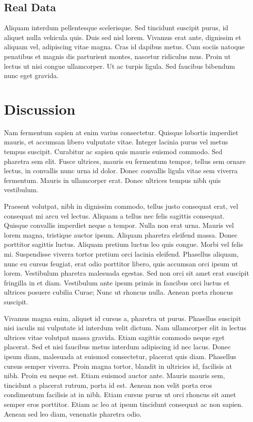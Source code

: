 \documentclass[draft,grl]{AGUTeX}
\begin{document}
\begin{article}
\subsection{Real Data}

Aliquam interdum pellentesque scelerisque. Sed tincidunt suscipit purus, id aliquet nulla vehicula quis. Duis sed nisl lorem. Vivamus erat ante, dignissim et aliquam vel, adipiscing vitae magna. Cras id dapibus metus. Cum sociis natoque penatibus et magnis dis parturient montes, nascetur ridiculus mus. Proin ut lectus ut nisi congue ullamcorper. Ut ac turpis ligula. Sed faucibus bibendum nunc eget gravida.


\section{Discussion}

Nam fermentum sapien at enim varius consectetur. Quisque lobortis imperdiet mauris, et accumsan libero vulputate vitae. Integer lacinia purus vel metus tempus suscipit. Curabitur ac sapien quis mauris euismod commodo. Sed pharetra sem elit. Fusce ultrices, mauris eu fermentum tempor, tellus sem ornare lectus, in convallis nunc urna id dolor. Donec convallis ligula vitae sem viverra fermentum. Mauris in ullamcorper erat. Donec ultrices tempus nibh quis vestibulum.

Praesent volutpat, nibh in dignissim commodo, tellus justo consequat erat, vel consequat mi arcu vel lectus. Aliquam a tellus nec felis sagittis consequat. Quisque convallis imperdiet neque a tempor. Nulla non erat urna. Mauris vel lorem magna, tristique auctor ipsum. Aliquam pharetra eleifend massa. Donec porttitor sagittis luctus. Aliquam pretium luctus leo quis congue. Morbi vel felis mi. Suspendisse viverra tortor pretium orci lacinia eleifend. Phasellus aliquam, nunc eu cursus feugiat, erat odio porttitor libero, quis accumsan orci ipsum ut lorem. Vestibulum pharetra malesuada egestas. Sed non orci sit amet erat suscipit fringilla in et diam. Vestibulum ante ipsum primis in faucibus orci luctus et ultrices posuere cubilia Curae; Nunc ut rhoncus nulla. Aenean porta rhoncus suscipit.

Vivamus magna enim, aliquet id cursus a, pharetra ut purus. Phasellus suscipit nisi iaculis mi vulputate id interdum velit dictum. Nam ullamcorper elit in lectus ultrices vitae volutpat massa gravida. Etiam sagittis commodo neque eget placerat. Sed et nisi faucibus metus interdum adipiscing id nec lacus. Donec ipsum diam, malesuada at euismod consectetur, placerat quis diam. Phasellus cursus semper viverra. Proin magna tortor, blandit in ultricies id, facilisis at nibh. Proin eu neque est. Etiam euismod auctor ante. Mauris mauris sem, tincidunt a placerat rutrum, porta id est. Aenean non velit porta eros condimentum facilisis at in nibh. Etiam cursus purus ut orci rhoncus sit amet semper eros porttitor. Etiam ac leo at ipsum tincidunt consequat ac non sapien. Aenean sed leo diam, venenatis pharetra odio.


\end{article}
\end{document}
